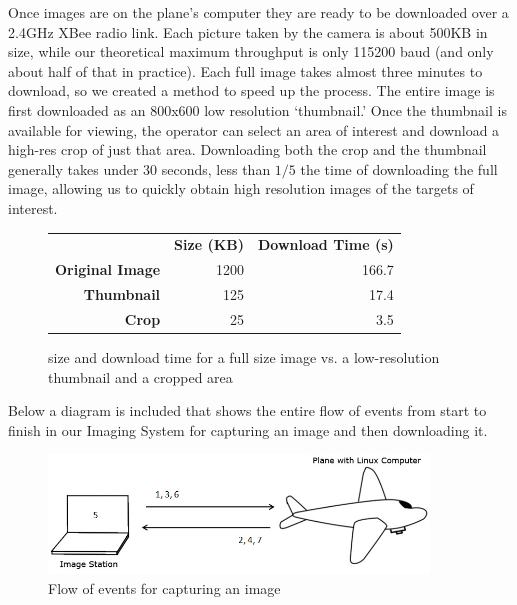 \documentclass[10pt]{report}
\begin{document}
Once images are on the plane's computer they are ready to be downloaded over a 2.4GHz XBee radio link.  Each picture taken by the camera is about 500KB in size, while our theoretical maximum throughput is only 115200 baud (and only about half of that in practice).  Each full image takes almost three minutes to download, so we created a method to speed up the process.  The entire image is first downloaded as an 800x600 low resolution `thumbnail.'  Once the thumbnail is available for viewing, the operator can select an area of interest and download a high-res crop of just that area.  Downloading both the crop and the thumbnail generally takes under 30 seconds, less than $1/5$ the time of downloading the full image, allowing us to quickly obtain high resolution images of the targets of interest.

\begin{figure} [H]
	\centering
		\begin{tabular}{rrr}
		 & {\bf Size (KB)} & {\bf Download Time (s)} \\
		 {\bf Original Image} &        1200 &       166.7 \\
		 {\bf Thumbnail} &        125 &       17.4 \\
		 {\bf Crop} &         25 &        3.5 \\
		\end{tabular}
	\caption[Download Times for Images] {size and download time for a full size image vs. a low-resolution thumbnail and a cropped area}
	\label{fig:imagedownloadtimes}
\end{figure}

Below a diagram is included that shows the entire flow of events from start to finish in our Imaging System for capturing an image and then downloading it.

\begin{figure} [H]
  \centering
  	\includegraphics[width=0.9\textwidth]{../images/CaptureProcess.jpg}
  	\caption[Image Capture Process]{Flow of events for capturing an image}
  	\label{fig:imagecaptureprocess}
\end{figure}
\end{document}

